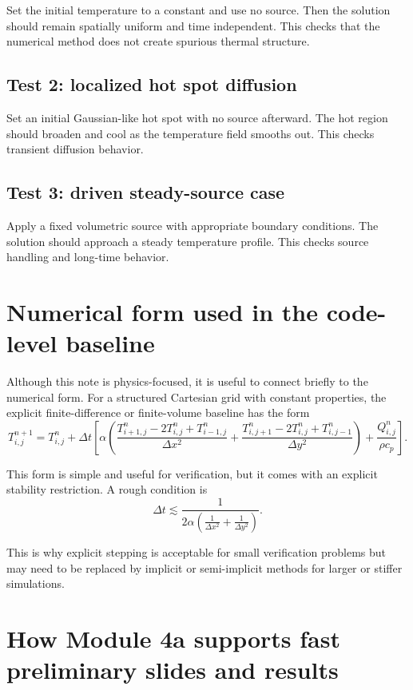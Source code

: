 \documentclass[11pt]{article}
\begin{document}
Set the initial temperature to a constant and use no source. Then the solution should remain spatially uniform and time independent. This checks that the numerical method does not create spurious thermal structure.

\subsection{Test 2: localized hot spot diffusion}

Set an initial Gaussian-like hot spot with no source afterward. The hot region should broaden and cool as the temperature field smooths out. This checks transient diffusion behavior.

\subsection{Test 3: driven steady-source case}

Apply a fixed volumetric source with appropriate boundary conditions. The solution should approach a steady temperature profile. This checks source handling and long-time behavior.

\section{Numerical form used in the code-level baseline}

Although this note is physics-focused, it is useful to connect briefly to the numerical form. For a structured Cartesian grid with constant properties, the explicit finite-difference or finite-volume baseline has the form
\[
T_{i,j}^{n+1} = T_{i,j}^{n} + \Delta t \left[
\alpha \left(
\frac{T_{i+1,j}^{n}-2T_{i,j}^{n}+T_{i-1,j}^{n}}{\Delta x^2}
+
\frac{T_{i,j+1}^{n}-2T_{i,j}^{n}+T_{i,j-1}^{n}}{\Delta y^2}
\right)
+
\frac{Q_{i,j}^{n}}{\rho c_p}
\right].
\]

This form is simple and useful for verification, but it comes with an explicit stability restriction. A rough condition is
\[
\Delta t \lesssim \frac{1}{2\alpha\left(\frac{1}{\Delta x^2}+\frac{1}{\Delta y^2}\right)}.
\]

This is why explicit stepping is acceptable for small verification problems but may need to be replaced by implicit or semi-implicit methods for larger or stiffer simulations.

\section{How Module 4a supports fast preliminary slides and results}
\end{document}
